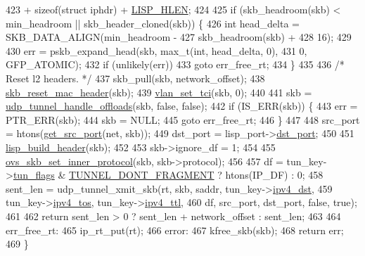 \begin{DoxyCode}
423             + \textcolor{keyword}{sizeof}(\textcolor{keyword}{struct }iphdr) + \hyperlink{linux_2vport-lisp_8c_a432175729adc4f68dad362484b077981}{LISP\_HLEN};
424 
425     \textcolor{keywordflow}{if} (skb\_headroom(skb) < min\_headroom || skb\_header\_cloned(skb)) \{
426         \textcolor{keywordtype}{int} head\_delta = SKB\_DATA\_ALIGN(min\_headroom -
427                         skb\_headroom(skb) +
428                         16);
429 
430         err = pskb\_expand\_head(skb, max\_t(\textcolor{keywordtype}{int}, head\_delta, 0),
431                     0, GFP\_ATOMIC);
432         \textcolor{keywordflow}{if} (unlikely(err))
433             \textcolor{keywordflow}{goto} err\_free\_rt;
434     \}
435 
436     \textcolor{comment}{/* Reset l2 headers. */}
437     skb\_pull(skb, network\_offset);
438     \hyperlink{skbuff_8h_aaf81c26756757ac1e1d7e6933f61bdaf}{skb\_reset\_mac\_header}(skb);
439     \hyperlink{vlan_8h_ad5de1acaa10b947f662a8200417dd6c4}{vlan\_set\_tci}(skb, 0);
440 
441     skb = \hyperlink{udp__tunnel_8h_a2c093a62e766646df5cf62f8ea3aba91}{udp\_tunnel\_handle\_offloads}(skb, \textcolor{keyword}{false}, \textcolor{keyword}{false});
442     \textcolor{keywordflow}{if} (IS\_ERR(skb)) \{
443         err = PTR\_ERR(skb);
444         skb = NULL;
445         \textcolor{keywordflow}{goto} err\_free\_rt;
446     \}
447 
448     src\_port = htons(\hyperlink{linux_2vport-lisp_8c_a106a25589649bc37c3905cb00fb59f62}{get\_src\_port}(net, skb));
449     dst\_port = lisp\_port->\hyperlink{structlisp__port_a3f0943c0da5e5c60f9e8e4068d49215e}{dst\_port};
450 
451     \hyperlink{linux_2vport-lisp_8c_afacb726760b72b4d01c27f470d4b7a3a}{lisp\_build\_header}(skb);
452 
453     skb->ignore\_df = 1;
454 
455     \hyperlink{gso_8h_afa56bd287d4a10d09bf25d8219f574b5}{ovs\_skb\_set\_inner\_protocol}(skb, skb->protocol);
456 
457     df = tun\_key->\hyperlink{structovs__key__ipv4__tunnel_a7459e66ecf90329eb2fa6cf3fc4781db}{tun\_flags} & \hyperlink{ip__tunnels_8h_a3b33c8fadb48f2281d5852e2a0d8eeff}{TUNNEL\_DONT\_FRAGMENT} ? htons(IP\_DF) : 0;
458     sent\_len = udp\_tunnel\_xmit\_skb(rt, skb, saddr, tun\_key->\hyperlink{structovs__key__ipv4__tunnel_ae443d381a97f53bbc4139fe36c0aae30}{ipv4\_dst},
459                        tun\_key->\hyperlink{structovs__key__ipv4__tunnel_a69594eaf9d7dfc2824b264484e02498e}{ipv4\_tos}, tun\_key->\hyperlink{structovs__key__ipv4__tunnel_a24de7472a8c22903fce96b73dab68a40}{ipv4\_ttl},
460                        df, src\_port, dst\_port, \textcolor{keyword}{false}, \textcolor{keyword}{true});
461 
462     \textcolor{keywordflow}{return} sent\_len > 0 ? sent\_len + network\_offset : sent\_len;
463 
464 err\_free\_rt:
465     ip\_rt\_put(rt);
466 error:
467     kfree\_skb(skb);
468     \textcolor{keywordflow}{return} err;
469 \}
\end{DoxyCode}
\hypertarget{linux_2vport-lisp_8c_a91b2b04c344bf1a50d02d4084fabf482}{}
